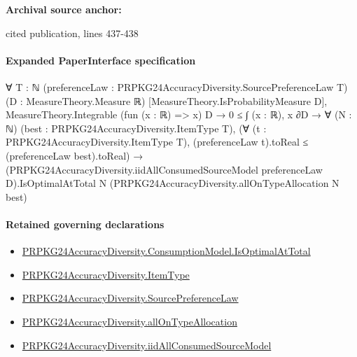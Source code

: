\documentclass[10pt]{article}
\begin{document}
\textbf{Archival source anchor:} {\footnotesize\raggedright cited publication, lines 437-\allowbreak{}438\par}
\paragraph{Expanded PaperInterface specification}
\begin{ReviewVerbatim}
∀ {T : ℕ} (preferenceLaw : PRPKG24AccuracyDiversity.SourcePreferenceLaw T) (D : MeasureTheory.Measure ℝ)
  [MeasureTheory.IsProbabilityMeasure D],
  MeasureTheory.Integrable (fun (x : ℝ) => x) D →
    0 ≤ ∫ (x : ℝ), x ∂D →
      ∀ (N : ℕ) (best : PRPKG24AccuracyDiversity.ItemType T),
        (∀ (t : PRPKG24AccuracyDiversity.ItemType T), (preferenceLaw t).toReal ≤ (preferenceLaw best).toReal) →
          (PRPKG24AccuracyDiversity.iidAllConsumedSourceModel preferenceLaw D).IsOptimalAtTotal N
            (PRPKG24AccuracyDiversity.allOnTypeAllocation N best)
\end{ReviewVerbatim}

\paragraph{Retained governing declarations}
\begin{itemize}\raggedright
\item \hyperlink{governing-declaration-dce768684c24aad2}{PRPKG24\allowbreak{}Accuracy\allowbreak{}Diversity.\allowbreak{}Consumption\allowbreak{}Model.\allowbreak{}Is\allowbreak{}Optimal\allowbreak{}At\allowbreak{}Total}
\item \hyperlink{governing-declaration-562ef32e180a12be}{PRPKG24\allowbreak{}Accuracy\allowbreak{}Diversity.\allowbreak{}Item\allowbreak{}Type}
\item \hyperlink{governing-declaration-e662f313179ba80f}{PRPKG24\allowbreak{}Accuracy\allowbreak{}Diversity.\allowbreak{}Source\allowbreak{}Preference\allowbreak{}Law}
\item \hyperlink{governing-declaration-292edfa75481381f}{PRPKG24\allowbreak{}Accuracy\allowbreak{}Diversity.\allowbreak{}all\allowbreak{}On\allowbreak{}Type\allowbreak{}Allocation}
\item \hyperlink{governing-declaration-0adbc2c6e86ab2c5}{PRPKG24\allowbreak{}Accuracy\allowbreak{}Diversity.\allowbreak{}iid\allowbreak{}All\allowbreak{}Consumed\allowbreak{}Source\allowbreak{}Model}
\end{itemize}
\end{document}
